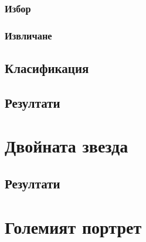 \documentclass[12pt]{report}
\begin{document}
        \subsection{Избор}
        \subsection{Извличане}
    \section{Класификация}    
    \section{Резултати}
\chapter{Двойната звезда}
    \section{Резултати}
\chapter{Големият портрет}
\end{document}
